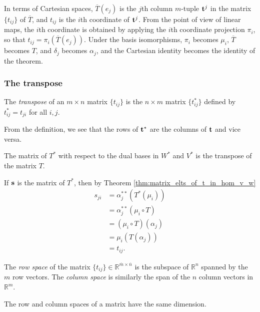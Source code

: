 \documentclass[12pt,letterpaper,reqno]{article}
\numberwithin{equation}{section}
\newcommand{\ti}[1]{\textit{#1}}
\begin{document}
In terms of Cartesian spaces, $\overline{T}(e_j)$ is the $j$th column $m$-tuple ${\bf t}^j$ in the matrix $\{t_{ij}\}$ of $\overline{T}$, and $t_{ij}$ is the $i$th coordinate of ${\bf t}^j$. From the point of view of linear maps, the $i$th coordinate is obtained by applying the $i$th coordinate projection $\pi_i$, so that $t_{ij}=\pi_i(\overline{T}(e_j))$. Under the basis isomorphisms, $\pi_i$ becomes $\mu_i$, $\overline{T}$ becomes $T$, and $\delta_j$ becomes $\alpha_j$, and the Cartesian identity becomes the identity of the theorem.

\subsubsection{The transpose}

\begin{defn}
	The \ti{transpose} of an $m \times n$ matrix $\{t_{ij}\}$ is the $n \times m$ matrix $\{t^*_{ij}\}$ defined by $t^*_{ij}=t_{ji}$ for all $i,j$. 
\end{defn}
From the definition, we see that the rows of ${\bf t}^*$ are the columns of ${\bf t}$ and vice versa.

\begin{thm}[Matrix of $T^*$]
	The matrix of $T^*$ with respect to the dual bases in $W^*$ and $V^*$ is the transpose of the matrix $T$.
\end{thm}

\begin{pf}
If ${\bf s}$ is the matrix of $T^*$, then by Theorem \eqref{thm:matrix_elts_of_t_in_hom_v_w}
\begin{align*}
	s_{ji}&=\alpha_j^{**}(T^*(\mu_i)) \\
	&=\alpha_j^{**}(\mu_i \circ T) \\
	&=(\mu_i \circ T)(\alpha_j) \\
	&=\mu_i(T(\alpha_j)) \\
	&=t_{ij}.
\end{align*}	
\end{pf}

\begin{defn}
	The \ti{row space} of the matrix $\{t_{ij}\} \in \mathbb{R}^{\overline{m} \times \overline{n}}$ is the subspace of $\mathbb{R}^n$ spanned by the $m$ row vectors. The \ti{column space} is similarly the span of the $n$ column vectors in $\mathbb{R}^m$.
\end{defn}

\begin{thm}
	The row and column spaces of a matrix have the same dimension.
\end{thm}
\end{document}
